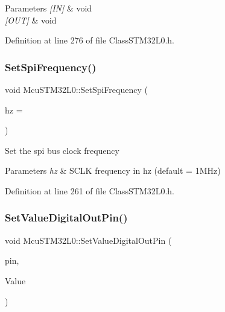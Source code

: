 \begin{DoxyParams}{Parameters}
{\em \mbox{[}\+I\+N\mbox{]}} & void \\
\hline
{\em \mbox{[}\+O\+U\+T\mbox{]}} & void \\
\hline
\end{DoxyParams}


Definition at line 276 of file Class\+S\+T\+M32\+L0.\+h.

\mbox{\label{class_mcu_s_t_m32_l0_a08ba6f34a908e8e118c1f8276dfa767e}} 
\subsubsection{\texorpdfstring{Set\+Spi\+Frequency()}{SetSpiFrequency()}}
{\footnotesize\ttfamily void Mcu\+S\+T\+M32\+L0\+::\+Set\+Spi\+Frequency (\begin{DoxyParamCaption}\item[{int}]{hz = {} }\end{DoxyParamCaption})\hspace{0.3cm}{\ttfamily [inline]}}

Set the spi bus clock frequency


\begin{DoxyParams}{Parameters}
{\em hz} & S\+C\+LK frequency in hz (default = 1\+M\+Hz) \\
\hline
\end{DoxyParams}


Definition at line 261 of file Class\+S\+T\+M32\+L0.\+h.

\mbox{\label{class_mcu_s_t_m32_l0_a3c06e74b5182d28f26ddb3fec6d9234d}} 
\subsubsection{\texorpdfstring{Set\+Value\+Digital\+Out\+Pin()}{SetValueDigitalOutPin()}}
{\footnotesize\ttfamily void Mcu\+S\+T\+M32\+L0\+::\+Set\+Value\+Digital\+Out\+Pin (\begin{DoxyParamCaption}\item[{\mbox{\hyperlink{_class_s_t_m32_l0_8h_a5ceb873075d76667eb54dc6a7d2734d1}{Pin\+Name}}}]{pin,  }\item[{int}]{Value }\end{DoxyParamCaption})\hspace{0.3cm}{\ttfamily [inline]}}



